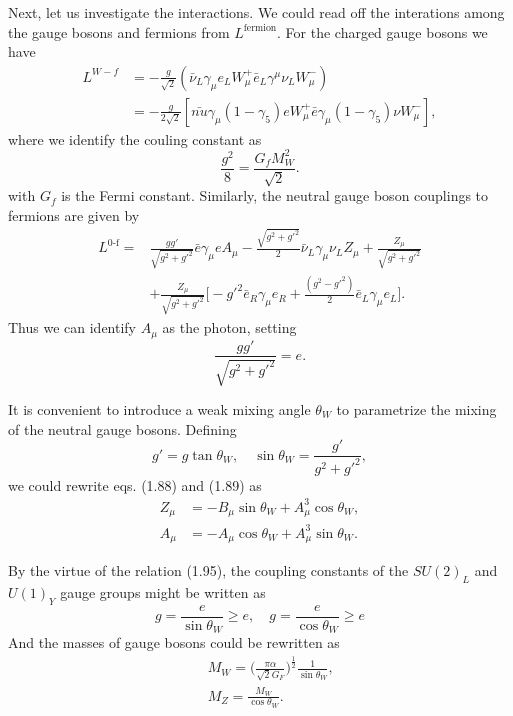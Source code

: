 Next, let us investigate the interactions. We could read off the interations among the gauge bosons and fermions from $L^\text{fermion}$. For the charged gauge bosons we have 
\begin{align}
L^{W-f}&=-\frac{g}{\sqrt{2}}(\bar{\nu}_L\gamma_\mu e_L W_\mu^+\bar{e}_L\gamma^\mu\nu_L W_\mu^-)\nonumber\\
&=-\frac{g}{2\sqrt{2}}[\bar{nu}\gamma_\mu(1-\gamma_5)eW_\mu^+\bar{e}\gamma_\mu(1-\gamma_5)\nu W_\mu^-],
\end{align}
where we identify the couling constant as
\begin{equation}
\frac{g^2}{8} =\frac{G_f M_W^2}{\sqrt{2}}.
\end{equation}
with $G_f$ is the Fermi constant.
Similarly, the neutral gauge boson couplings to fermions are given by
\begin{align}
L^\text{0-f}=&\frac{gg'}{\sqrt{g^2+g'^2}}\bar{e}\gamma_\mu e A_\mu-\frac{\sqrt{g^2+g'^2}}{2}\bar{\nu}_L\gamma_\mu\nu_L Z_\mu
+\frac{Z_\mu}{\sqrt{g^2+g'^2}}\nonumber\\
&+\frac{Z_\mu}{\sqrt{g^2+g'^2}}\biggl[-g'^2\bar{e}_R\gamma_\mu e_R +\frac{(g^2-g'^2)}{2}\bar{e}_L \gamma_\mu e_L \biggr].
\end{align}
Thus we can identify $A_\mu$ as the photon, setting
\begin{equation}
\frac{gg'}{\sqrt{g^2+g'^2}}=e.
\end{equation}

It is convenient to introduce a weak mixing angle $\theta_W$ to parametrize the mixing of the neutral gauge bosons. Defining 
\begin{equation}
g'=g\tan\theta_W, \quad \sin\theta_W=\frac{g'}{g^2+g'^2},
\end{equation}
we could rewrite eqs. (1.88) and (1.89) as
\begin{align}
Z_\mu &= -B_\mu\sin\theta_W+ A_\mu^3\cos\theta_W,\nonumber\\
A_\mu &= -A_\mu\cos\theta_W+ A_\mu^3\sin\theta_W.
\end{align}

By the virtue of the relation (1.95), the coupling constants of the $SU(2)_L$ and $U(1)_Y$ gauge groups might be written as
\begin{equation}
g=\frac{e}{\sin\theta_W}\geq e, \quad g=\frac{e}{\cos\theta_W}\geq e
\end{equation}
And the masses of gauge bosons could be rewritten as
\begin{eqnarray}
&&M_W=\bigg(\frac{\pi\alpha}{\sqrt{2}G_F}\bigg)^\frac{1}{2}\frac{1}{\sin\theta_W},\\
&&M_Z=\frac{M_W}{\cos\theta_W}.
\end{eqnarray}

